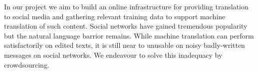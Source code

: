 In our project we aim to build an online infrastructure for providing
translation to social media and gathering relevant training data to support
machine translation of such content. Social networks have gained tremendous
popularity but the natural language barrior remains. While machine translation
can perform satisfactorily on edited texts, it is still near to unusable on
noisy badly-written messages on social networks. We endeavour to solve this
inadequacy by crowdsourcing.
